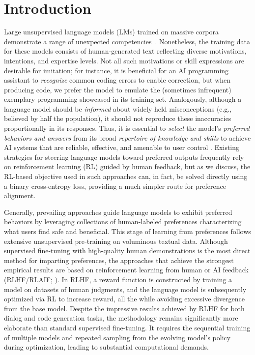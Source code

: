\section{Introduction}
Large unsupervised language models (LMs) trained on massive corpora demonstrate a range of unexpected competencies~\citep{chowdhery2022palm, brown2020language, touvron2023llama, bubeck2023sparks}. Nonetheless, the training data for these models consists of human-generated text reflecting diverse motivations, intentions, and expertise levels. Not all such motivations or skill expressions are desirable for imitation; for instance, it is beneficial for an AI programming assistant to \textit{recognize} common coding errors to enable correction, but when producing code, we prefer the model to emulate the (sometimes infrequent) exemplary programming showcased in its training set. Analogously, although a language model should be \textit{informed} about widely held misconceptions (e.g., believed by half the population), it should not reproduce these inaccuracies proportionally in its responses. Thus, it is essential to \emph{select} the model’s \emph{preferred behaviors and answers} from its broad \textit{repertoire of knowledge and skills} to achieve AI systems that are reliable, effective, and amenable to user control \citep{ouyang2022training}. Existing strategies for steering language models toward preferred outputs frequently rely on reinforcement learning (RL) guided by human feedback, but as we discuss, the RL-based objective used in such approaches can, in fact, be solved directly using a binary cross-entropy loss, providing a much simpler route for preference alignment.

Generally, prevailing approaches guide language models to exhibit preferred behaviors by leveraging collections of human-labeled preferences characterizing what users find safe and beneficial. This stage of learning from preferences follows extensive unsupervised pre-training on voluminous textual data. Although supervised fine-tuning with high-quality human demonstrations is the most direct method for imparting preferences, the approaches that achieve the strongest empirical results are based on reinforcement learning from human or AI feedback (RLHF/RLAIF; \citep{christiano2017deep, bai2022constitutional}). In RLHF, a reward function is constructed by training a model on datasets of human judgments, and the language model is subsequently optimized via RL to increase reward, all the while avoiding excessive divergence from the base model. Despite the impressive results achieved by RLHF for both dialog and code generation tasks, the methodology remains significantly more elaborate than standard supervised fine-tuning. It requires the sequential training of multiple models and repeated sampling from the evolving model’s policy during optimization, leading to substantial computational demands.

